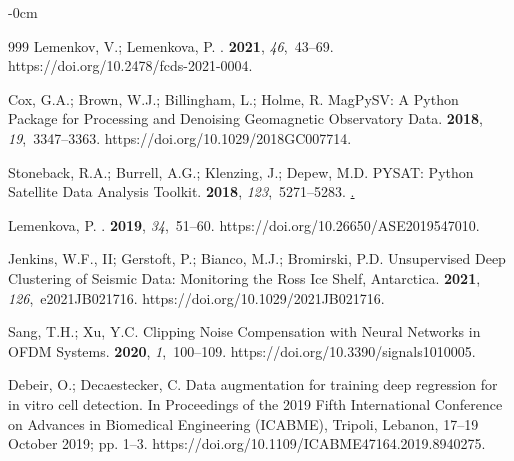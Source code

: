 \documentclass[sensors,article,accept,moreauthors,pdftex]{Definitions/mdpi}
\begin{document}
\begin{adjustwidth}{-\extralength}{0cm}
\begin{thebibliography}{999}
Lemenkov, V.; Lemenkova, P.
.
 {\bf 2021}, {\em
  46},~43--69.
\newblock
{https://doi.org/10.2478/fcds-2021-0004}.

Cox, G.A.; Brown, W.J.; Billingham, L.; Holme, R.
\newblock MagPySV: A Python Package for Processing and Denoising Geomagnetic
  Observatory Data.
 {\bf 2018}, {\em
  19},~3347--3363.
\newblock
 {https://doi.org/10.1029/2018GC007714}.

Stoneback, R.A.; Burrell, A.G.; Klenzing, J.; Depew, M.D.
\newblock PYSAT: Python Satellite Data Analysis Toolkit.
 {\bf 2018}, {\em
  123},~5271--5283.
\newblock
\href{https://doi.org/https://doi.org/10.1029/2018JA025297}.

Lemenkova, P.
.
 {\bf 2019}, {\em 34},~51--60.
\newblock
 {https://doi.org/10.26650/ASE2019547010}.

Jenkins, W.F., II; Gerstoft, P.; Bianco, M.J.; Bromirski, P.D.
\newblock Unsupervised Deep Clustering of Seismic Data: Monitoring the Ross Ice
  Shelf, Antarctica.
 {\bf 2021}, {\em
  126},~e2021JB021716.
\newblock
{https://doi.org/10.1029/2021JB021716}.

Sang, T.H.; Xu, Y.C.
\newblock Clipping Noise Compensation with Neural Networks in OFDM Systems.
 {\bf 2020}, {\em 1},~100--109.
\newblock
  {https://doi.org/10.3390/signals1010005}.

Debeir, O.; Decaestecker, C.
\newblock Data augmentation for training deep regression for in vitro cell
  detection.
\newblock  In Proceedings of the 2019 Fifth International Conference on Advances in Biomedical
  Engineering (ICABME), Tripoli, Lebanon, 17--19 October 2019; pp. 1--3. %
\newblock
  {https://doi.org/10.1109/ICABME47164.2019.8940275}.


\end{thebibliography}
\end{adjustwidth}
\end{document}
